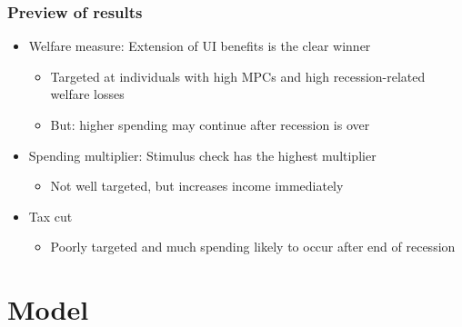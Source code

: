 \documentclass[pdflatex,aspectratio=169]{beamer}
\begin{document}
    \begin{frame}
      \frametitle{Preview of results}
      \begin{itemize}[<+->]
        \itemsep = \bigskipamount 
      \item Welfare measure: Extension of UI benefits is the clear winner 
        \begin{itemize}[<+->]
          \itemsep = .25\bigskipamount 
        \item Targeted at individuals with high MPCs and high recession-related welfare losses
        \item But: higher spending may continue after recession is over 
        \end{itemize}
      \item Spending multiplier: Stimulus check has the highest multiplier 
        \begin{itemize}[<+->]
          \itemsep = .25\bigskipamount 
        \item Not well targeted, but increases income immediately 
        \end{itemize}
      \item Tax cut
        \begin{itemize}[<+->]
          \itemsep = .25\bigskipamount 
        \item Poorly targeted and much spending likely to occur after end of recession
        \end{itemize}
      \end{itemize}
    \end{frame}






    \section{Model}
\end{document}
